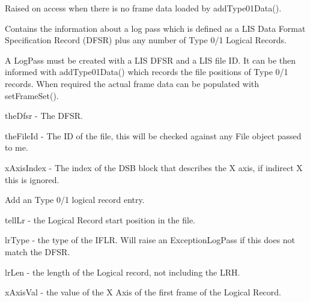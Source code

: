 \documentclass[letterpaper,10pt,english]{sphinxmanual}
\begin{document}

\begin{fulllineitems}
\label{\detokenize{ref/LIS/core/LogPass:TotalDepth.LIS.core.LogPass.ExceptionLogPassNoType01Data}}
Raised on access when there is no frame data loaded by addType01Data().

\end{fulllineitems}


\begin{fulllineitems}
\label{\detokenize{ref/LIS/core/LogPass:TotalDepth.LIS.core.LogPass.LogPass}}
Contains the information about a log pass which is defined as a LIS Data
Format Specification Record (DFSR) plus any number of Type 0/1 Logical Records.

A LogPass must be created with a LIS DFSR and a LIS file ID. It can be then informed
with addType01Data() which records the file positions of Type 0/1 records.
When required the actual frame data can be populated with setFrameSet().

theDfsr - The DFSR.

theFileId - The ID of the file, this will be checked against any File object passed to me.

xAxisIndex - The index of the DSB block that describes the X axis, if indirect X this is ignored.

\begin{fulllineitems}
\label{\detokenize{ref/LIS/core/LogPass:TotalDepth.LIS.core.LogPass.LogPass.addType01Data}}
Add an Type 0/1 logical record entry.

tellLr - the Logical Record start position in the file.

lrType - the type of the IFLR. Will raise an ExceptionLogPass if this does not match the DFSR.

lrLen - the length of the Logical record, not including the LRH.

xAxisVal - the value of the X Axis of the first frame of the Logical Record.


\end{fulllineitems}
\end{fulllineitems}
\end{document}
